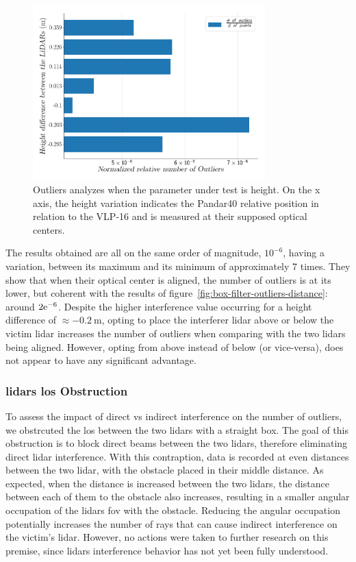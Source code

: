 \begin{figure}[!ht]
	\centering
	\includegraphics[width=0.8\textwidth]{img/lidar-interference/box-filtering/interference-box-filter-outliers-height.png}
	\caption{Outliers analyzes when the parameter under test is height. On the x axis, the height variation indicates the Pandar40 relative position in relation to the VLP-16 and is measured at their supposed optical centers.}
	\label{fig:box-filter-outliers-height}
\end{figure}

The results obtained are all on the same order of magnitude, $10^{-6}$, having a variation, between its maximum and its minimum of approximately 7 times. They show that when their optical center is aligned, the number of outliers is at its lower, but coherent with the results of figure~\ref{fig:box-filter-outliers-distance}: around $2\mathrm{e}^{-6}$. Despite the higher interference value occurring for a height difference of $\approx \SI{-0.2}{\meter}$, opting to place the interferer \ac{lidar} above or below the victim \ac{lidar} increases the number of outliers when comparing with the two \acp{lidar} being aligned. However, opting from above instead of below (or vice-versa), does not appear to have any significant advantage. 

\subsubsection{\acp{lidar} \ac{los} Obstruction}
To assess the impact of direct vs indirect interference on the number of outliers, we obstrcuted the \acf{los} between the two \acp{lidar} with a straight box. The goal of this obstruction is to block direct beams between the two \acp{lidar}, therefore eliminating direct \ac{lidar} interference. With this contraption, data is recorded at even distances between the two \ac{lidar}, with the obstacle placed in their middle distance. As expected, when the distance is increased between the two \acp{lidar}, the distance between each of them to the obstacle also increases, resulting in a smaller angular occupation of the \acp{lidar} \ac{fov} with the obstacle. Reducing the angular occupation potentially increases the number of rays that can cause indirect interference on the victim's \ac{lidar}. However, no actions were taken to further research on this premise, since \acp{lidar} interference behavior has not yet been fully understood.


